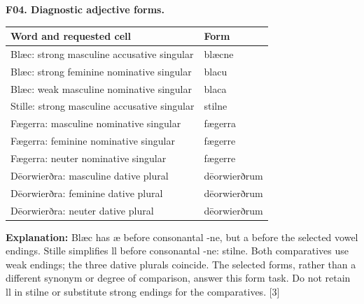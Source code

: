 \par\begin{minipage}{\linewidth}\raggedright
\textbf{F04. Diagnostic adjective forms.}

\par\begingroup
\fontsize{10.5}{13.2}\selectfont
\setlength{\LTleft}{0pt}\setlength{\LTright}{\fill}
\noindent
\begin{tabular}{@{}>{\raggedright\arraybackslash}p{83.32mm}>{\raggedright\arraybackslash}p{37.87mm}@{}}
\toprule
\textbf{Word and requested cell} & \textbf{Form} \\
\midrule
Blæc: strong masculine accusative singular & blæcne \\
Blæc: strong feminine nominative singular & blacu \\
Blæc: weak masculine nominative singular & blaca \\
Stille: strong masculine accusative singular & stilne \\
Fægerra: masculine nominative singular & fægerra \\
Fægerra: feminine nominative singular & fægerre \\
Fægerra: neuter nominative singular & fægerre \\
Dēorwierðra: masculine dative plural & dēorwierðrum \\
Dēorwierðra: feminine dative plural & dēorwierðrum \\
Dēorwierðra: neuter dative plural & dēorwierðrum \\
\bottomrule
\end{tabular}
\par\endgroup

\textbf{Explanation:} Blæc has æ before consonantal -ne, but a before the selected vowel endings. Stille simplifies ll before consonantal -ne: stilne. Both comparatives use weak endings; the three dative plurals coincide. The selected forms, rather than a different synonym or degree of comparison, answer this form task. Do not retain ll in stilne or substitute strong endings for the comparatives. [3]

\end{minipage}\par\addvspace{4pt}

